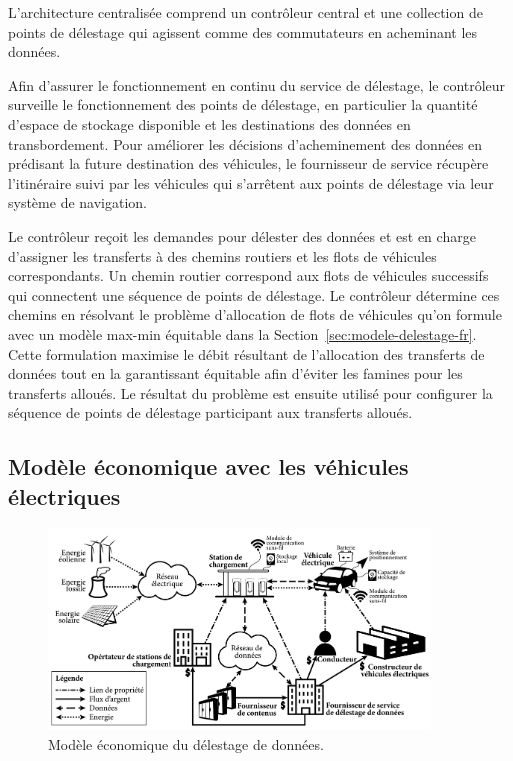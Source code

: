  
L’architecture centralisée comprend un contrôleur central et une collection de points de délestage qui agissent comme des commutateurs en acheminant les données.  
 
 
Afin d’assurer le fonctionnement en continu du service de délestage, le contrôleur surveille le fonctionnement des points de délestage, en particulier la quantité d’espace de stockage disponible et les destinations des données en transbordement. Pour améliorer les décisions d’acheminement des données en prédisant la future destination des véhicules, le fournisseur de service récupère l’itinéraire suivi par les véhicules qui s’arrêtent aux points de délestage via leur système de navigation.  
 
 
Le contrôleur reçoit les demandes pour délester des données et est en charge d’assigner les transferts à des chemins routiers et les flots de véhicules correspondants. Un chemin routier correspond aux flots de véhicules successifs qui connectent une séquence de points de délestage. Le contrôleur détermine ces chemins en résolvant le problème d’allocation de flots de véhicules qu’on formule avec un modèle max-min équitable dans la Section~\ref{sec:modele-delestage-fr}. Cette formulation maximise le débit résultant de l’allocation des transferts de données tout en la garantissant équitable afin d’éviter les famines pour les transferts alloués. Le résultat du problème est ensuite utilisé pour configurer la séquence de points de délestage participant aux transferts alloués.  
 
 
\subsection{Modèle économique avec les véhicules électriques} 
 
\begin{figure}[h!]
    \centering
    \includegraphics[width=0.9\textwidth]{figures-fr/business-plan-fr.pdf}
    \caption{Modèle économique du délestage de données.}
    \label{fig:business-model-fr}
\end{figure}

